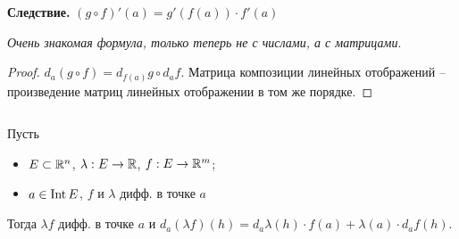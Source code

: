 \textbf{Следствие.} $(g \circ f)'(a) = g'(f(a)) \cdot f'(a)$

\textit{Очень знакомая формула, только теперь не с числами, 
а с матрицами}.
\begin{proof}
    $d_a(g \circ f) = d_{f(a)} g \circ d_a f$. 
    Матрица композиции линейных отображений -- произведение 
    матриц линейных отображении в том же порядке.
\end{proof}

\begin{theorem} $ $

    Пусть 
    \begin{itemize}
        \item $E \subset \mathbb{R}^n$, $\lambda : E \to \mathbb{R}$, $f : E \to \mathbb{R}^m$;
        \item $a \in \operatorname{Int} E$, $f$ и $\lambda$ дифф. в точке $a$
    \end{itemize}
    Тогда $\lambda f$ дифф. в точке $a$ и $d_a (\lambda f)(h)
    = d_a \lambda (h) \cdot f(a) + \lambda(a) \cdot d_a f(h)$.
\end{theorem}
